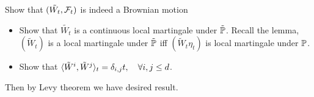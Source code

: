 \pf 
Show that $(\tilde{W_t}, \mathcal{F}_t)$ is indeed a Brownian motion 
\begin{itemize}
    \item Show that $\tilde{W_t}$ is a continuous local martingale under $\tilde{\mathbb{P}}$. Recall the lemma, $(\tilde{W}_t)$ is a local martingale under $\tilde{\mathbb{P}}$ iff $(\tilde{W}_t \eta_t)$ is local martingale under $\mathbb{P}$.
    \item Show that $\langle{\tilde{W}^i, \tilde{W}^j} \rangle_{t} = \delta_{i,j}t ,\quad \forall i,j\leq d$.
\end{itemize}
Then by Levy theorem we have desired result.